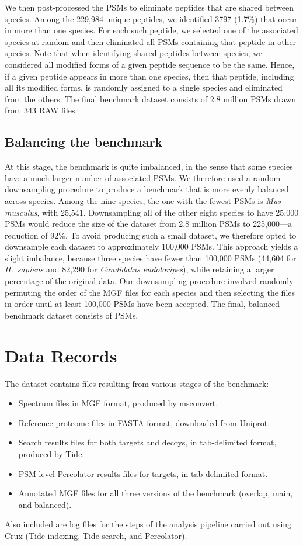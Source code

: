 \documentclass{article}
\newcommand{\fixme}[1]{{\color{red}{\bf FIXME: #1}\color{black}}}
\begin{document}
We then post-processed the PSMs to eliminate peptides that are shared between species.
Among the 229,984 unique peptides, we identified 3797 (1.7\%) that occur in more than one species.
For each such peptide, we selected one of the associated species at random and then eliminated all PSMs containing that peptide in other species.
Note that when identifying shared peptides between species, we
considered all modified forms of a given peptide sequence to be the
same.  Hence, if a given peptide appears in more than one species,
then that peptide, including all its modified forms, is randomly
assigned to a single species and eliminated from the others.
The final benchmark dataset consists of 2.8 million PSMs drawn from 343 RAW files.

\subsection*{Balancing the benchmark}

At this stage, the benchmark is quite imbalanced, in the sense that some species have a much larger number of associated PSMs.  We therefore used a random downsampling procedure to produce a benchmark that is more evenly balanced across species.  Among the nine species, the one with the fewest PSMs is \textit{Mus musculus}, with 25,541.  Downsampling all of the other eight species to have 25,000 PSMs would reduce the size of the dataset from 2.8 million PSMs to 225,000---a reduction of 92\%.  To avoid producing such a small dataset, we therefore opted to downsample each dataset to approximately 100,000 PSMs.  This approach yields a slight imbalance, because three species have fewer than 100,000 PSMs (44,604 for \textit{H.\ sapiens} and 82,290 for \textit{Candidatus endoloripes}), while retaining a larger percentage of the original data.  Our downsampling procedure involved randomly permuting the order of the MGF files for each species and then selecting the files in order until at least 100,000 PSMs have been accepted.  The final, balanced benchmark dataset consists of \fixme{XXX} PSMs.

\section*{Data Records}

The dataset contains files resulting from various stages of the benchmark:
\begin{itemize}
\item Spectrum files in MGF format, produced by msconvert.
\item Reference proteome files in FASTA format, downloaded from Uniprot.
\item Search results files for both targets and decoys, in tab-delimited format, produced by Tide.
\item PSM-level Percolator results files for targets, in tab-delimited format.
\item Annotated MGF files for all three versions of the benchmark (overlap, main, and balanced).
\end{itemize}
Also included are log files for the steps of the analysis pipeline carried out using Crux \cite{park2008rapid} (Tide indexing, Tide search, and Percolator).
\end{document}

